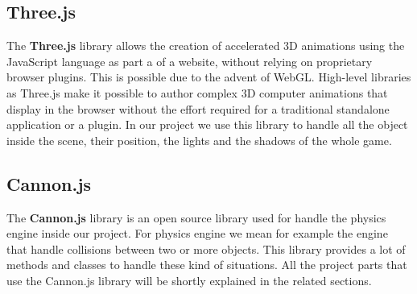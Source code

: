 \documentclass[a4paper, 11pt, titlepage]{report}
\begin{document}
	 	\subsection{Three.js}
		    \par The \textbf{Three.js} library \cite{threejsdocs} allows the creation of accelerated 3D animations using the JavaScript language as part a of a website, without relying on proprietary browser plugins. This is possible due to the advent of WebGL.
		    High-level libraries as Three.js make it possible to author complex 3D computer animations that display in the browser without the effort required for a traditional standalone application or a plugin.
		    In our project we use this library to handle all the object inside the scene, their position, the lights and the shadows of the whole game.
		\subsection{Cannon.js}
		    \par The \textbf{Cannon.js} library \cite{cannonjsdocs} is an open source library used for handle the physics engine inside our project. For physics engine we mean for example the engine that handle collisions between two or more objects. This library provides a lot of methods and classes to handle these kind of situations. All the project parts that use the Cannon.js library will be shortly explained in the related sections.

\end{document}
